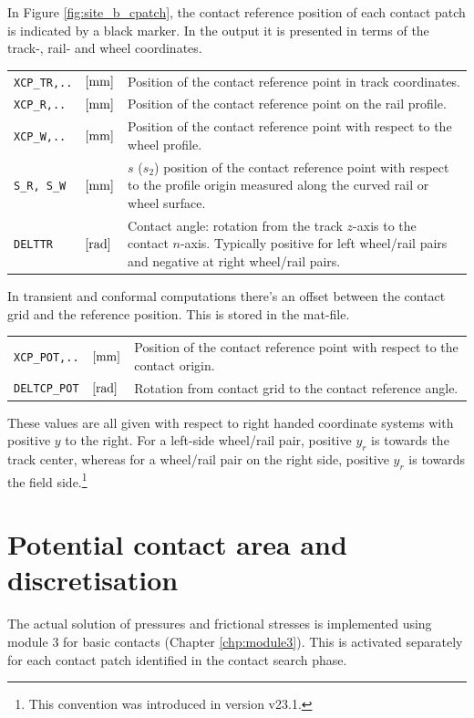 \documentclass[12pt]{report}
\newenvironment{inputvars}{\vspace{0.4\baselineskip}%

\begin{tabular}{>{\raggedright}p{22mm}p{19mm}p{113mm}}}{
\end{tabular}

}
\newcommand{\inpvar}[3]{{\small\tt #1} & $#2$ & #3 \\[1ex]}
\begin{document}
In Figure \ref{fig:site_b_cpatch}, the contact reference position of each
contact patch is indicated by a black marker. In the output it is presented
in terms of the track-, rail- and wheel coordinates.\label{pg:contact_refpos}
\begin{inputvars}
\inpvar{XCP\_TR,..}{\bunit{mm}}{Position of the contact reference point in
        track coordinates.}
\inpvar{XCP\_R,..}{\bunit{mm}}{Position of the contact reference point on
        the rail profile.}
\inpvar{XCP\_W,..}{\bunit{mm}}{Position of the contact reference point with
        respect to the wheel profile.}
\inpvar{S\_R, S\_W}{\bunit{mm}}{$s$ ($s_2$) position of the contact reference
        point with respect to the profile origin measured along the curved
        rail or wheel surface.}
\inpvar{DELTTR}{\bunit{rad}}{Contact angle: rotation from the track $z$-axis
        to the contact $n$-axis. Typically positive for left wheel/rail pairs
        and negative at right wheel/rail pairs.}
\end{inputvars}
In transient and conformal computations there's an offset between the
contact grid and the reference position. This is stored in the mat-file.
\begin{inputvars}
\inpvar{XCP\_POT,..}{\bunit{mm}}{Position of the contact reference point
        with respect to the contact origin.}
\inpvar{DELTCP\_POT}{\bunit{rad}}{Rotation from contact grid to the contact
        reference angle.}
\end{inputvars}
These values are all given with respect to right handed coordinate systems
with positive $y$ to the right. For a left-side wheel/rail pair, positive
$y_r$ is towards the track center, whereas for a wheel/rail pair on the
right side, positive $y_r$ is towards the field side.\footnote{This
convention was introduced in version v23.1.}

\section{Potential contact area and discretisation}
\label{sec:wr_potcon}

The actual solution of pressures and frictional stresses is implemented
using module 3 for basic contacts (Chapter \ref{chp:module3}). This is
activated separately for each contact patch identified in the contact
search phase.
\end{document}
